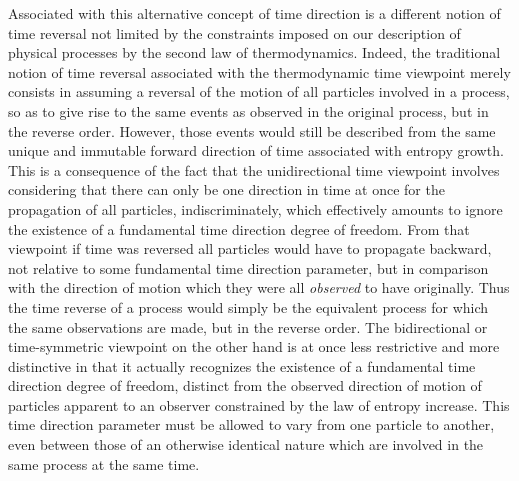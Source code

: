 \documentclass[notitlepage,12pt]{report}
\begin{document}
Associated with this alternative concept of time direction is a different notion of time reversal not limited by the constraints imposed on our description of physical processes by the second law of thermodynamics. Indeed, the traditional notion of time reversal associated with the thermodynamic time viewpoint merely consists in assuming a reversal of the motion of all particles involved in a process, so as to give rise to the same events as observed in the original process, but in the reverse order. However, those events would still be described from the same unique and immutable forward direction of time associated with entropy growth. This is a consequence of the fact that the unidirectional time viewpoint involves considering that there can only be one direction in time at once for the propagation of all particles, indiscriminately, which effectively amounts to ignore the existence of a fundamental time direction degree of freedom. From that viewpoint if time was reversed all particles would have to propagate backward, not relative to some fundamental time direction parameter, but in comparison with the direction of motion which they were all \textit{observed} to have originally. Thus the time reverse of a process would simply be the equivalent process for which the same observations are made, but in the reverse order. The bidirectional or time-symmetric viewpoint on the other hand is at once less restrictive and more distinctive in that it actually recognizes the existence of a fundamental time direction degree of freedom, distinct from the observed direction of motion of particles apparent to an observer constrained by the law of entropy increase. This time direction parameter must be allowed to vary from one particle to another, even between those of an otherwise identical nature which are involved in the same process at the same time.
\end{document}
